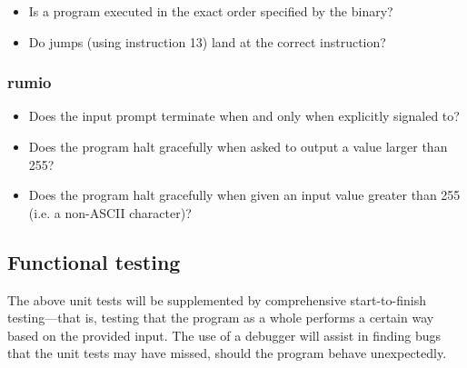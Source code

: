 \documentclass{article}
\begin{document}
\begin{itemize}
    \item Is a program executed in the exact order specified by the binary?
    \item Do jumps (using instruction 13) land at the correct instruction?
\end{itemize}

\subsubsection{rumio}

\begin{itemize}
    \item Does the input prompt terminate when and only when explicitly signaled to?
    \item Does the program halt gracefully when asked to output a value larger than 255?
    \item Does the program halt gracefully when given an input value greater than 255 (i.e. a non-ASCII character)?
\end{itemize}

\subsection{Functional testing}

The above unit tests will be supplemented by comprehensive start-to-finish testing---that is, testing that the program as a whole performs a certain way based on the provided input.
The use of a debugger will assist in finding bugs that the unit tests may have missed, should the program behave unexpectedly.
\end{document}
